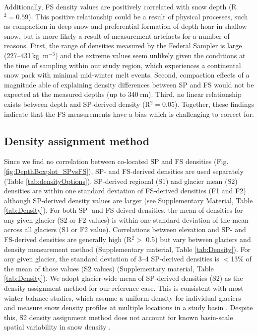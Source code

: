 \documentclass[twocolumn, letterpaper]{igs}
\begin{document}
Additionally, FS density values are positively correlated with snow depth (R$^2= 0.59$). This positive relationship could be a result of physical processes, such as compaction in deep snow and preferential formation of depth hoar in shallow snow, but is more likely a result of measurement artefacts for a number of reasons. First, the range of densities measured by the Federal Sampler is large (227--431\,kg\, m$^{-3}$) and the extreme values seem unlikely given the conditions at the time of sampling within our study region, which experiences a continental snow pack with minimal mid-winter melt events. Second, compaction effects of a magnitude able of explaining density differences between SP and FS would not be expected at the measured depths (up to 340\,cm). Third, no linear relationship exists between depth and SP-derived density (R$^2 = 0.05$). Together, these findings indicate that the FS measurements have a bias which is challenging to correct for.

\subsection{Density assignment method}

Since we find no correlation between co-located SP and FS densities (Fig. \ref{fig:DepthBoxplot_SPvsFS}), SP- and FS-derived densities are used separately (Table \ref{tab:densityOptions}). SP-derived regional (S1) and glacier mean (S2) densities are within one standard deviation of FS-derived densities (F1 and F2) although SP-derived density values are larger (see Supplementary Material, Table \ref{tab:Density}). For both SP- and FS-deived densities, the mean of densities for any given glacier (S2 or F2 values) is within one standard deviation of the mean across all glaciers (S1 or F2 value). Correlations between elevation and SP- and FS-derived densities are generally high (R$^2>$ 0.5) but vary between glaciers and density measurement method (Supplementary material, Table \ref{tab:Density}). For any given glacier, the standard deviation of 3--4 SP-derived densities is $<$13\% of the mean of those values (S2 values) (Supplementary material, Table \ref{tab:Density}). We adopt glacier-wide mean of SP-derived densities (S2) as the density assignment method for our reference case. This is consistent with most winter balance studies, which assume a uniform density for individual glaciers and measure snow density profiles at multiple locations in a study basin \citep[e.g.][]{Elder1991,McGrath2015,Cullen2017}. Despite this, S2 density assignment method does not account for known basin-scale spatial variability in snow density \citep[e.g.][]{Wetlaufer2016}. 
\end{document}
